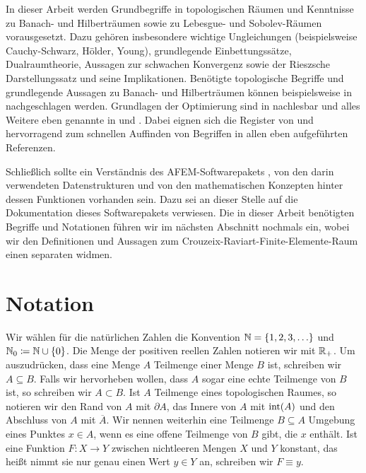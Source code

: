 In dieser Arbeit werden Grundbegriffe in topologischen Räumen und Kenntnisse zu
Ba\-nach- und Hilberträumen sowie zu Lebesgue- und Sobolev-Räumen vorausgesetzt.
Dazu gehören insbesondere wichtige Ungleichungen (beispielsweise
Cauchy-Schwarz, Hölder, Young), grundlegende Einbettungssätze, Dualraumtheorie,
Aussagen zur schwachen Konvergenz sowie der Rieszsche Darstellungssatz und
seine Implikationen.
Benötigte topologische Begriffe und grundlegende Aussagen zu Banach- und
Hilberträumen können beispielsweise in \cite{Zei86} nachgeschlagen werden.
Grundlagen der Optimierung sind in \cite{Zei85} nachlesbar und alles Weitere
eben genannte in \cite{Zei90a} und \cite{Zei90b}. 
Dabei eignen sich die Register von \cite{Zei90b} und \cite{Zei85} hervorragend
zum schnellen Auffinden von Begriffen in allen eben aufgeführten
Referenzen.

Schließlich sollte ein Verständnis des AFEM-Softwarepakets \cite{Car09}, von
den darin verwendeten Datenstrukturen und von den mathematischen Konzepten
hinter dessen Funktionen vorhanden sein. 
Dazu sei an dieser Stelle auf die Dokumentation \cite{CGKNRR10} dieses
Softwarepakets verwiesen.
Die in dieser Arbeit benötigten Begriffe und Notationen führen wir im nächsten
Abschnitt nochmals ein, wobei wir den Definitionen und Aussagen zum
Crouzeix-Raviart-Finite-Elemente-Raum einen separaten
 widmen.


\section{Notation}
\label{sec:notation}

Wir wählen für die natürlichen Zahlen die Konvention
$\mathbb{N}=\{1,2,3,\ldots\}$ und $\mathbb{N}_0\coloneqq\mathbb{N}\cup\{0\}$. 
Die Menge der positiven reellen Zahlen notieren wir mit $\mathbb{R}_+$.
Um auszudrücken, dass eine Menge $A$ Teilmenge einer Menge $B$ ist, schreiben
wir $A\subseteq B$. Falls wir hervorheben wollen, dass $A$ sogar eine echte
Teilmenge von $B$ ist, so schreiben wir $A\subset B$.
Ist $A$ Teilmenge eines topologischen Raumes, so notieren wir den Rand von $A$
mit $\partial A$, das Innere von $A$ mit $\operatorname{int}(A)$ und den Abschluss
von $A$ mit $\overline A$.
Wir nennen weiterhin eine Teilmenge $B\subseteq A$ Umgebung eines Punktes $x\in
A$, wenn es eine offene Teilmenge von $B$ gibt, die $x$ enthält.
Ist eine Funktion $F:X\to Y$ zwischen nichtleeren Mengen $X$ und $Y$ konstant,
das heißt nimmt sie nur genau einen Wert $y\in Y$ an, schreiben wir $F\equiv
y$.

